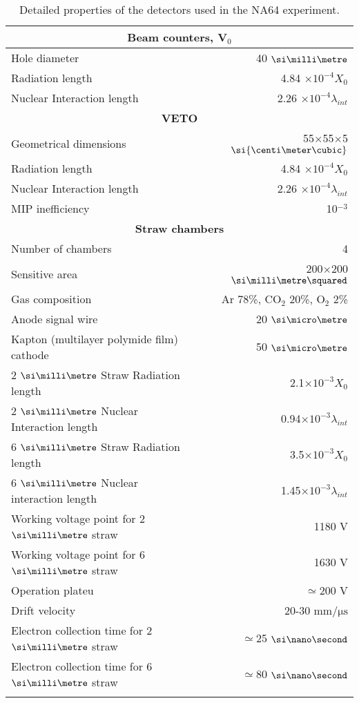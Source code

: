 \begin{longtable}{|l|r|}
  \hline
  \multicolumn{2}{|c|}{\textbf{Beam counters, V$_0$}}\\
  \hline
  Hole diameter & 40 $\mmi$ \\
  Radiation length & 4.84 $\times10^{-4} X_0$ \\
  Nuclear Interaction length & 2.26 $\times 10^{-4} \lambda_{int}$ \\
  \hline
  \multicolumn{2}{|c|}{\textbf{VETO}}\\
  \hline
  Geometrical dimensions & 55$\times$55$\times$5 $\si{\centi\meter\cubic}$ \\
  Radiation length & 4.84 $\times10^{-4} X_0$ \\
  Nuclear Interaction length & 2.26 $\times 10^{-4} \lambda_{int}$ \\
  MIP inefficiency & 10$^{-3}$ \\
  \hline
  \multicolumn{2}{|c|}{\textbf{Straw chambers}}\\
  \hline
  Number of chambers & 4 \\
  Sensitive area & 200$\times$200 $\mms$ \\
  Gas composition & Ar 78\%, CO$_2$ 20\%, O$_2$ 2\% \\
  Anode signal wire & 20 $\mum$ \\
  Kapton (multilayer polymide film) cathode & 50 $\mum$ \\
  2 $\mmi$ Straw Radiation length & 2.1$\times 10^{-3}X_0$ \\
  2 $\mmi$ Nuclear Interaction length & 0.94$\times 10^{-3}\lambda_{int}$ \\
  6 $\mmi$ Straw Radiation length & 3.5$\times 10^{-3}X_0$ \\
  6 $\mmi$ Nuclear interaction length & 1.45$\times 10^{-3}\lambda_{int}$ \\
  Working voltage point for 2 $\mmi$ straw & 1180 \si{\volt} \\
  Working voltage point for 6 $\mmi$ straw & 1630 \si{\volt} \\
  Operation plateu & $\simeq$200 \si{\volt} \\
  Drift velocity & 20-30 $\si{\milli\meter\per\micro\second}$ \\
  Electron collection time for 2 $\mmi$ straw & $\simeq$25 $\nas$ \\
  Electron collection time for 6 $\mmi$ straw & $\simeq$80 $\nas$ \\
  
  
  
  \hline
  \caption[sub-detectors description]{Detailed properties of the detectors used in the NA64 experiment.}
  \label{tab:detector-tables}
\end{longtable}

